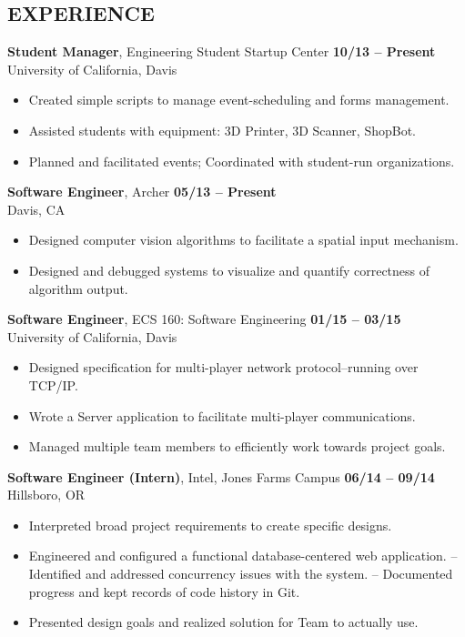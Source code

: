 \documentclass[line, letterpaper, 10pt]{res}
\begin{document}
\begin{resume}
\section{EXPERIENCE}
    {\bf Student Manager}, Engineering Student Startup Center \hfill {\bf 10/13 -- Present} \\
    University of California, Davis
    \begin{itemize} \itemsep -2pt %
        \item Created simple scripts to manage event-scheduling and forms management.
        \item Assisted students with equipment: 3D Printer, 3D Scanner, ShopBot.
        \item Planned and facilitated events; Coordinated with student-run organizations.
    \end{itemize}
	
    {\bf Software Engineer}, Archer \hfill {\bf 05/13 -- Present} \\
    Davis, CA
    \begin{itemize} \itemsep -2pt %
        \item Designed computer vision algorithms to facilitate a spatial input mechanism.
        \item Designed and debugged systems to visualize and quantify correctness of algorithm output.

    \end{itemize}
    
    {\bf Software Engineer}, ECS 160: Software Engineering \hfill {\bf 01/15 -- 03/15} \\
    University of California, Davis
    \begin{itemize} \itemsep -2pt
	    \item Designed specification for multi-player network protocol--running over TCP/IP.
	    \item Wrote a Server application to facilitate multi-player communications.
	    \item Managed multiple team members to efficiently work towards project goals.
    \end{itemize}
    
    
    {\bf Software Engineer (Intern)}, Intel, Jones Farms Campus \hfill {\bf 06/14 -- 09/14} \\
    Hillsboro, OR
    \begin{itemize} \itemsep -2pt
        \item Interpreted broad project requirements to create specific designs.
        \item Engineered and configured a functional database-centered web application.
            \subitem -- Identified and addressed concurrency issues with the system.
            \subitem -- Documented progress and kept records of code history in Git.
        \item Presented design goals and realized solution for Team to actually use.
        

\end{itemize}
\end{resume}
\end{document}
